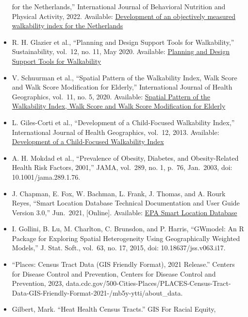 \documentclass[
]{article}
\begin{document}
\begin{itemize}
  for the Netherlands,'' International Journal of Behavioral Nutrition
  and Physical Activity, 2022. Available:
  \href{https://ijbnpa.biomedcentral.com/articles/10.1186/s12966-022-01270-8}{Development
  of an objectively measured walkability index for the Netherlands}
\item
  R. H. Glazier et al., ``Planning and Design Support Tools for
  Walkability,'' Sustainability, vol.~12, no. 11, May 2020. Available:
  \href{https://www.mdpi.com/2071-1050/12/11/4405}{Planning and Design
  Support Tools for Walkability}
\item
  V. Schuurman et al., ``Spatial Pattern of the Walkability Index, Walk
  Score and Walk Score Modification for Elderly,'' International Journal
  of Health Geographics, vol.~11, no. 5, 2020. Available:
  \href{https://www.mdpi.com/2220-9964/11/5/279}{Spatial Pattern of the
  Walkability Index, Walk Score and Walk Score Modification for Elderly}
\item
  L. Giles-Corti et al., ``Development of a Child-Focused Walkability
  Index,'' International Journal of Health Geographics, vol.~12, 2013.
  Available:
  \href{https://ij-healthgeographics.biomedcentral.com/articles/10.1186/1476-072X-12-61}{Development
  of a Child-Focused Walkability Index}
\item
  A. H. Mokdad et al., ``Prevalence of Obesity, Diabetes, and
  Obesity-Related Health Risk Factors, 2001,'' JAMA, vol.~289, no. 1,
  p.~76, Jan.~2003, doi: 10.1001/jama.289.1.76.
\item
  J. Chapman, E. Fox, W. Bachman, L. Frank, J. Thomas, and A. Rourk
  Reyes, ``Smart Location Database Technical Documentation and User
  Guide Version 3.0,'' Jun.~2021, {[}Online{]}. Available:
  \href{https://www.epa.gov/system/files/documents/2023-10/epa_sld_3.0_technicaldocumentationuserguide_may2021_0.pdf}{EPA
  Smart Location Database}
\item
  I. Gollini, B. Lu, M. Charlton, C. Brunsdon, and P. Harris, ``GWmodel:
  An R Package for Exploring Spatial Heterogeneity Using Geographically
  Weighted Models,'' J. Stat. Soft., vol.~63, no. 17, 2015, doi:
  10.18637/jss.v063.i17.
\item
  ``Places: Census Tract Data (GIS Friendly Format), 2021 Release.''
  Centers for Disease Control and Prevention, Centers for Disease
  Control and Prevention, 2023,
  data.cdc.gov/500-Cities-Places/PLACES-Census-Tract-Data-GIS-Friendly-Format-2021-/mb5y-ytti/about\_data.
\item
  Gilbert, Mark. ``Heat Health Census Tracts.'' GIS For Racial Equity,

\end{itemize}
\end{document}

